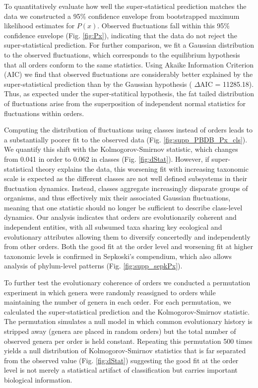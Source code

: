 To quantitatively evaluate how well the super-statistical prediction
matches the data we constructed a 95\% confidence envelope from
bootstrapped maximum likelihood estimates for $P(x)$. Observed
fluctuations fall within this 95\% confidence envelope
(Fig. \ref{fig:Px}), indicating that the data do not reject the
super-statistical prediction. For further comparison, we fit a
Gaussian distribution to the observed fluctuations, which corresponds
to the equilibrium hypothesis that all orders conform to the same
statistics. Using Akaike Information Criterion (AIC) we find that
observed fluctuations are considerably better explained by the
super-statistical prediction than by the Gaussian hypothesis ({\small
  $\Delta$}AIC = 11285.18). Thus, as expected under the
super-statitical hypothesis, the fat tailed distribution of
fluctuations arise from the superposition of independent normal
statistics for fluctuations within orders.

Computing the distribution of fluctuations using classes instead of
orders leads to a substantially poorer fit to the observed data
(Fig. \ref{fig:supp_PBDB_Px_cls}). We quantify this shift with the
Kolmogorov-Smirnov statistic, which changes from 0.041 in order to
0.062 in classes (Fig. \ref{fig:dStat}). However, if super-statistical
theory explains the data, this worsening fit with increasing taxonomic
scale is expected as the different classes are not well defined
subsystems in their fluctuation dynamics. Instead, classes aggregate
increasingly disparate groups of organisms, and thus effectively mix
their associated Gaussian fluctuations, meaning that one statistic
should no longer be sufficient to describe class-level dynamics. Our
analysis indicates that orders are evolutionarily coherent and
independent entities, with all subsumed taxa sharing key ecological
and evolutionary attributes allowing them to diversify concertedly and
independently from other orders. Both the good fit at the order level
and worsening fit at higher taxonomic levels is confirmed in
Sepkoski's compendium, which also allows analysis of phylum-level
patterns (Fig. \ref{fig:supp_sepkPx}).

To further test the evolutionary coherence of orders we conducted a
permutation experiment in which genera were randomly reassigned to
orders while maintaining the number of genera in each order. For each
permutation, we calculated the super-statistical prediction and the
Kolmogorov-Smirnov statistic. The permutation simulates a null model
in which common evolutionary history is stripped away (genera are
placed in random orders) but the total number of observed genera per
order is held constant.  Repeating this permutation 500 times yields a
null distribution of Kolmogorov-Smirnov statistics that is far
separated from the observed value (Fig. \ref{fig:dStat}) suggesting
the good fit at the order level is not merely a statistical artifact
of classification but carries important biological information.


